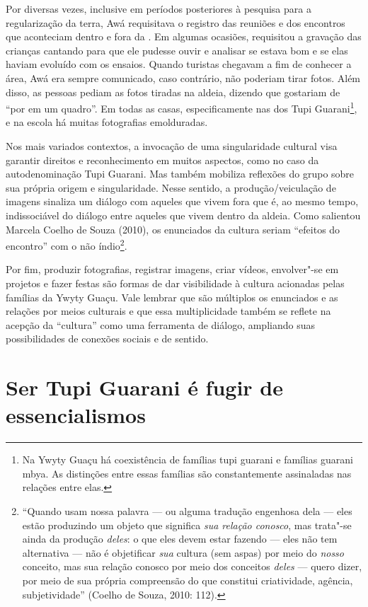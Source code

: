 Por diversas vezes, inclusive em períodos posteriores à pesquisa para a
regularização da terra, Awá requisitava o registro das reuniões e dos
encontros que aconteciam dentro e fora da . Em algumas ocasiões,
requisitou a gravação das crianças cantando para que ele pudesse ouvir
e analisar se estava bom e se elas haviam evoluído com os ensaios.
Quando turistas chegavam a fim de conhecer a área, Awá era sempre
comunicado, caso contrário, não poderiam tirar fotos. Além disso, as
pessoas pediam as fotos tiradas na aldeia, dizendo que gostariam de ``por
em um quadro''. Em todas as casas, especificamente nas dos Tupi
Guarani\footnote{Na Ywyty Guaçu há coexistência de famílias tupi
guarani e famílias guarani mbya. As distinções entre essas famílias são
constantemente assinaladas nas relações entre elas.}, e na escola há
muitas fotografias emolduradas.

Nos mais variados contextos, a invocação de uma singularidade cultural
visa garantir direitos e reconhecimento em muitos aspectos, como no
caso da autodenominação Tupi Guarani. Mas também mobiliza reflexões do
grupo sobre sua própria origem e singularidade. Nesse sentido, a
produção/veiculação de imagens sinaliza um diálogo com aqueles que
vivem fora que é, ao mesmo tempo, indissociável do diálogo entre
aqueles que vivem dentro da aldeia. Como salientou Marcela Coelho de
Souza (2010), os enunciados da cultura seriam ``efeitos do encontro'' com
o não índio\footnote{``Quando usam nossa palavra --- ou alguma tradução
engenhosa dela --- eles estão produzindo um objeto que significa \emph{sua
relação conosco}, mas trata"-se ainda da produção \emph{deles}: o que eles devem
estar fazendo --- eles não tem alternativa --- não é objetificar \emph{sua}
cultura (sem aspas) por meio do \emph{nosso} conceito, mas sua relação conosco
por meio dos conceitos \emph{deles} --- quero dizer, por meio de sua própria
compreensão do que constitui criatividade, agência, subjetividade''
(Coelho de Souza, 2010: 112).}.

Por fim, produzir fotografias, registrar imagens, criar vídeos,
envolver"-se em projetos e fazer festas são formas de dar visibilidade à
cultura acionadas pelas famílias da Ywyty Guaçu. Vale lembrar que são
múltiplos os enunciados e as relações por meios culturais e que essa
multiplicidade também se reflete na acepção da ``cultura'' como uma
ferramenta de diálogo, ampliando suas possibilidades de conexões
sociais e de sentido.

\section{Ser Tupi Guarani é fugir de essencialismos}

